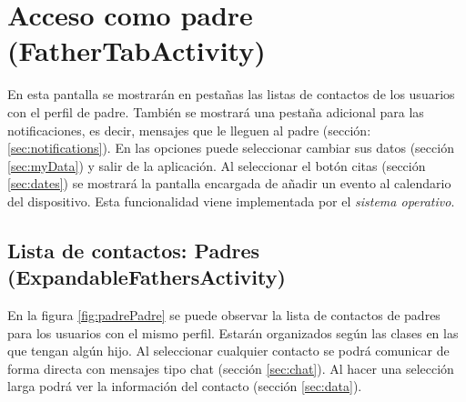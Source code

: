	\section{Acceso como padre (FatherTabActivity)}
	
		En esta pantalla se mostrarán en pestañas las listas de contactos de los usuarios con el perfil de padre. También se mostrará una pestaña adicional para las notificaciones, es decir, mensajes que le lleguen al padre (sección: \ref{sec:notifications}). En las opciones puede seleccionar cambiar sus datos (sección \ref{sec:myData}) y salir de la aplicación.
		Al seleccionar el botón citas (sección \ref{sec:dates}) se mostrará la pantalla encargada de añadir un evento al calendario del dispositivo. Esta funcionalidad viene implementada por el {\it sistema operativo}.
		
		\subsection{Lista de contactos: Padres (ExpandableFathersActivity)}
		
			En la figura \ref{fig:padrePadre} se puede observar la lista de contactos de padres para los usuarios con el mismo perfil. Estarán organizados según las clases en las que tengan algún hijo. Al seleccionar cualquier contacto se podrá comunicar de forma directa con mensajes tipo chat (sección \ref{sec:chat}). Al hacer una selección larga podrá ver la información del contacto (sección \ref{sec:data}).
			
